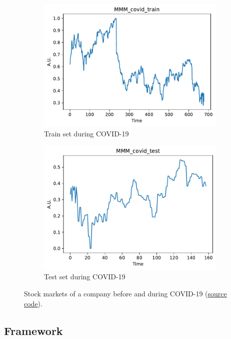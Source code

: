 \documentclass{article}
\begin{document}
\begin{figure}
\begin{subfigure}[b]{0.5\textwidth}
         \includegraphics[width=\textwidth]{../img/MMM_covid_train.pdf}
         \caption{Train set during COVID-19}
     \end{subfigure}%
     \begin{subfigure}[b]{0.5\textwidth}
         \centering
         \includegraphics[width=\textwidth]{../img/MMM_covid_test.pdf}
         \caption{Test set during COVID-19}
     \end{subfigure}
    \caption{Stock markets of a company before and during COVID-19 \cite{chandra2021bayesian} (\href{https://github.com/stevengogogo/ECEN649_FinalProject/blob/main/script/EXP_data_visualization.ipynb}{source code}).}
    \label{fig:data-series}
\end{figure}


\subsection{Framework}
\end{document}
